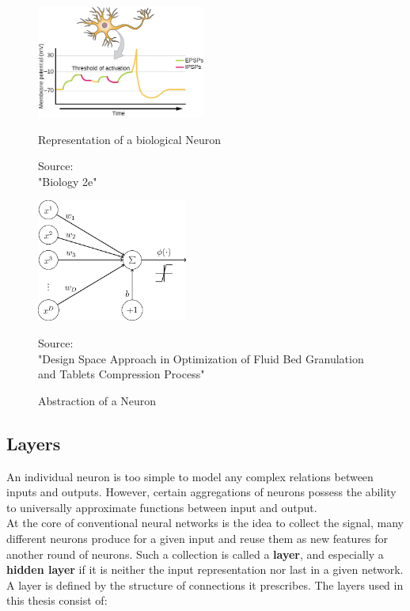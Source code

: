 \begin{figure}
	\centering
	\begin{minipage}{0.45\textwidth}
		\centering
		\includegraphics[height=140px]{gfx/2-Background/Biological_Neuron_edited.jpg}
		\caption{Representation of a biological Neuron}
		\label{fig:neuron1}
		\vspace{7pt}
		\footnotesize{ 
			Source:\\
			"Biology 2e" \cite{biology}}
	\end{minipage}
	\hfill
	\begin{minipage}{0.45\textwidth}
		\centering
		\includegraphics[height=152px]{gfx/2-Background/Abstract_Neuron.png}
		\caption{Abstraction of a Neuron}
		\label{fig:neuron2}
		\vspace{7pt}
		\footnotesize{ 
			Source:\\
			"Design Space Approach in Optimization of Fluid Bed Granulation and Tablets Compression Process" \cite{abstract_neuron}
		}
	\end{minipage}
\end{figure}

\subsection{Layers}
An individual neuron is too simple to model any complex relations between inputs and outputs. However, certain aggregations of neurons possess the ability to universally approximate functions between input and output.\cite{Approximator}\\
At the core of conventional neural networks is the idea to collect the signal, many different neurons produce for a given input and reuse them as new features for another round
of neurons. Such a collection is called a \textbf{layer}, and especially a \textbf{hidden layer} if it is neither the input representation nor last in a given network.
A layer is defined by the structure of connections it prescribes. The layers used in this thesis consist of:

